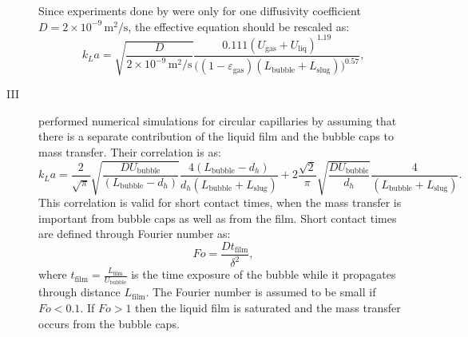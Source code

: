 \documentclass{article}
\begin{document}
\begin{description}
Since experiments done by \citeauthor{bercic-mass} were only for one diffusivity coefficient
$D=2\times 10^{-9}\,\mathrm{m^2/s}$, the effective equation should be rescaled as:
\begin{equation}
k_L a = \sqrt{\frac{D}{2\times 10^{-9}\,\mathrm{m^2/s}}}\frac{0.111
(U_{\mathrm{gas}}+U_{\mathrm{liq}})^{1.19}}{\bigl((1-\varepsilon_{\mathrm{gas}})(L_{\mathrm{bubble}}
+L_ {\mathrm{slug}} )\bigr)^{0.57} },
\end{equation}

\item[III]
\citet{vanbaten-circular} performed numerical simulations for circular capillaries by assuming that
there is a separate contribution of the liquid film and the bubble caps to mass transfer. Their
correlation is as:
\begin{equation}
k_L a = \frac{2}{\sqrt{\pi}}\sqrt{\frac{D U_{\mathrm{bubble}}}{(L_{\mathrm{bubble}}-d_h)}}
\frac{4(L_{\mathrm{bubble}}-d_h)}{d_h(L_{\mathrm{bubble}}+L_{\mathrm{slug}})}+2\frac{\sqrt{2}}{\pi}
 \sqrt{\frac{D U_{\mathrm{bubble}}}{d_h}} \frac{4}{(L_{\mathrm{bubble}}+L_{\mathrm{slug}})}.
\end{equation}
This correlation is valid for short contact times, when the mass transfer is important from bubble
caps as well as from the film. Short contact times are defined through Fourier number as:
\begin{equation}
Fo=\frac{D t_{\mathrm{film}}}{\delta^2},
\end{equation}
where $t_{\mathrm{film}}=\frac{L_{\mathrm{film}}}{U_{\mathrm{bubble}}}$ is the time exposure of the
bubble while it propagates through distance $L_{\mathrm{film}}$. The Fourier number is assumed to
be small if $Fo<0.1$. If $Fo>1$ then the liquid film is saturated and the mass transfer occurs from
the bubble caps.


\end{description}
\end{document}

